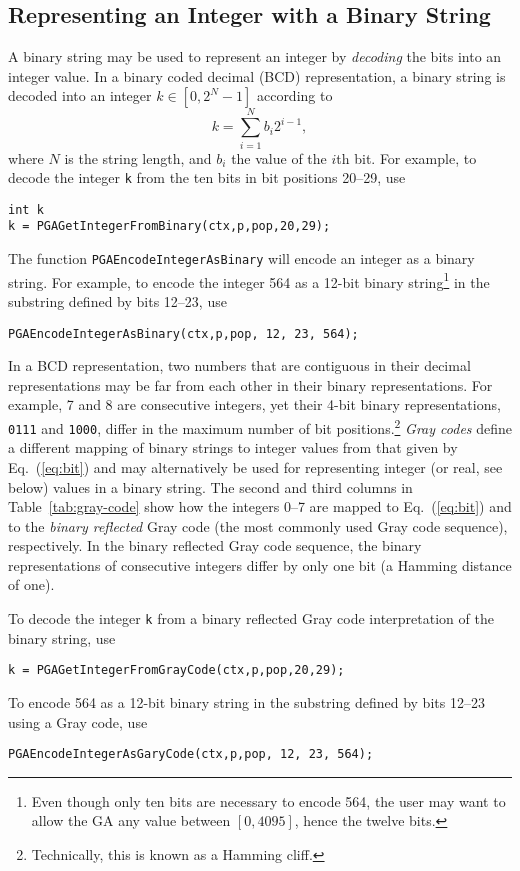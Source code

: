 \documentclass{report}
\begin{document}
\subsection{Representing an Integer with a Binary String}
\label{subsec:encode-integer}

A binary string may be used to represent an integer by {\em decoding} the
bits into an integer value.  In a binary coded decimal (BCD) representation, a
binary string is decoded into an integer $k
\in [0,2^{N}-1]$ according to
\begin{equation}
k = \sum_{i=1}^{N} b_{i} 2^{i-1},
\label{eq:bit}
\end{equation}
where $N$ is the string length, and $b_i$ the value of the $i$th bit.
For example, to decode the integer {\tt k} from the ten bits in bit positions
20--29, use
\begin{verbatim}
int k
k = PGAGetIntegerFromBinary(ctx,p,pop,20,29);
\end{verbatim}
The function {\tt PGAEncodeIntegerAsBinary} will encode an integer as a binary
string.  For example, to encode the integer 564 as a 12-bit binary
string\footnote{Even though only ten bits are necessary to encode 564, the
user may want to allow the GA any value between $[0,4095]$, hence the twelve
bits.}  in the substring defined by bits 12--23, use
\begin{verbatim}
PGAEncodeIntegerAsBinary(ctx,p,pop, 12, 23, 564);
\end{verbatim}

In a BCD representation, two numbers that are contiguous in their decimal
representations may be far from each other in their binary representations.
For example, 7 and 8 are consecutive integers, yet their 4-bit binary
representations, {\tt 0111} and {\tt 1000}, differ in the maximum number of
bit positions.\footnote{Technically, this is known as a Hamming cliff.}  {\em
Gray codes} define a different mapping of binary strings to integer values
from that given by Eq.~(\ref{eq:bit}) and may alternatively be used for
representing integer (or real, see below) values in a binary string.  The
second and third columns in Table~\ref{tab:gray-code} show how the integers
0--7 are mapped to Eq.~(\ref{eq:bit}) and to the {\em binary reflected} Gray
code (the most commonly used Gray code sequence), respectively.  In the binary
reflected Gray code sequence, the binary representations of consecutive
integers differ  by only one bit (a Hamming distance of one).

To decode the integer {\tt k} from a binary reflected Gray code
interpretation of the binary string, use
\begin{verbatim}
k = PGAGetIntegerFromGrayCode(ctx,p,pop,20,29);
\end{verbatim}
To encode 564 as a 12-bit binary string in the substring defined by bits 12--23 using a Gray code, use
\begin{verbatim}
PGAEncodeIntegerAsGaryCode(ctx,p,pop, 12, 23, 564);
\end{verbatim}
\end{document}
